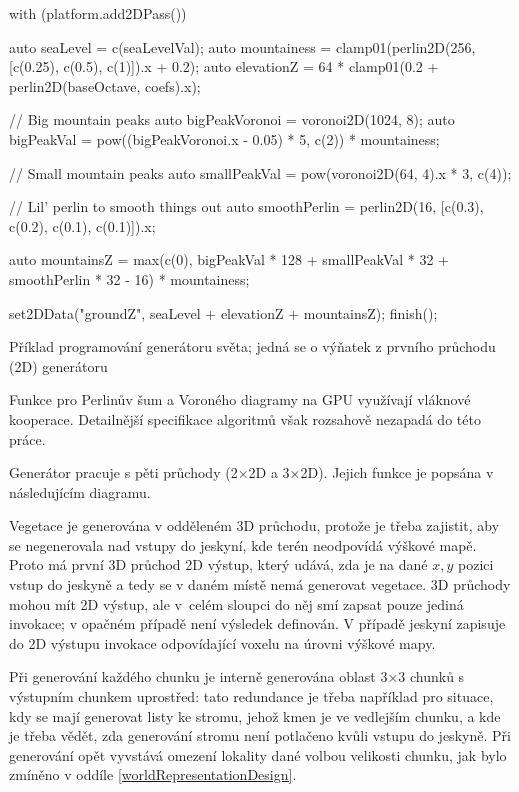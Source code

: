 \begin{codeFloat}[H]
	\begin{dcode}
with (platform.add2DPass()) {
	auto seaLevel = c(seaLevelVal);
	auto mountainess = clamp01(perlin2D(256, [c(0.25), c(0.5), c(1)]).x + 0.2);
	auto elevationZ = 64 * clamp01(0.2 + perlin2D(baseOctave, coefs).x);

	// Big mountain peaks
	auto bigPeakVoronoi = voronoi2D(1024, 8);
	auto bigPeakVal = pow((bigPeakVoronoi.x - 0.05) * 5, c(2)) * mountainess;
	
	// Small mountain peaks
	auto smallPeakVal = pow(voronoi2D(64, 4).x * 3, c(4));
	
	// Lil' perlin to smooth things out
	auto smoothPerlin = perlin2D(16, [c(0.3), c(0.2), c(0.1), c(0.1)]).x;
	
	auto mountainsZ = max(c(0), bigPeakVal * 128 + smallPeakVal * 32 + smoothPerlin * 32 - 16) * mountainess;

	set2DData("groundZ", seaLevel + elevationZ + mountainsZ);
	finish();
}
	\end{dcode}
	\caption{Příklad programování generátoru světa; jedná se o výňatek z prvního průchodu (2D) generátoru }
\end{codeFloat}

Funkce pro Perlinův šum a Voroného diagramy na GPU využívají vláknové kooperace. Detailnější specifikace algoritmů však rozsahově nezapadá do této práce.

Generátor  pracuje s pěti průchody (2×2D a 3×2D). Jejich funkce je popsána v následujícím diagramu.

Vegetace je generována v odděleném 3D průchodu, protože je třeba zajistit, aby se negenerovala nad vstupy do jeskyní, kde terén neodpovídá výškové mapě. Proto má první 3D průchod 2D výstup, který udává, zda je na dané $x,y$ pozici vstup do jeskyně a tedy se v daném místě nemá generovat vegetace. 3D průchody mohou mít 2D výstup, ale v~celém sloupci do něj smí zapsat pouze jediná invokace; v opačném případě není výsledek definován. V případě jeskyní zapisuje do 2D výstupu invokace odpovídající voxelu na úrovni výškové mapy.

Při generování každého chunku je interně generována oblast 3×3 chunků s výstupním chunkem uprostřed: tato redundance je třeba například pro situace, kdy se mají generovat listy ke stromu, jehož kmen je ve vedlejším chunku, a kde je třeba vědět, zda generování stromu není potlačeno kvůli vstupu do jeskyně. Při generování opět vyvstává omezení lokality dané volbou velikosti chunku, jak bylo zmíněno v oddíle \ref{worldRepresentationDesign}.

